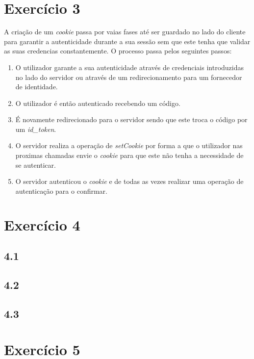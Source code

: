\documentclass[11pt]{report}
\begin{document}
\section{Exercício 3}
	A criação de um \textit{cookie} passa por vaias fases até ser guardado no lado do cliente para garantir a autenticidade durante a sua sessão sem que este tenha que validar as suas credencias constantemente.
	O processo passa pelos seguintes passos:
	\begin{enumerate}
		\item O utilizador garante a sua autenticidade através de credenciais introduzidas no lado do servidor ou através de um redirecionamento para um fornecedor de identidade.
		\item O utilizador é então autenticado recebendo um código. 
		\item É novamente redirecionado para o servidor sendo que este troca o código por um \textit{id\_token}.
		\item O servidor realiza a operação de \textit{setCookie} por forma a que o utilizador nas proximas chamadas envie o \textit{cookie} para que este não tenha a necessidade de se autenticar.
		\item O servidor autenticou o \textit{cookie} e de todas as vezes realizar uma operação de autenticação para o confirmar.
	\end{enumerate}

\section{Exercício 4}
	\subsection*{4.1}
	
	
	\subsection*{4.2}
	
	
	\subsection*{4.3}

\section{Exercício 5}


\newpage
\end{document}

